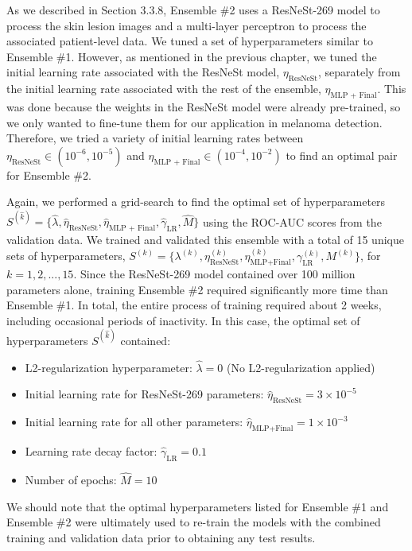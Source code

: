 \documentclass [MAS] {uclathes}
\begin{document}
As we described in Section 3.3.8, Ensemble \#2 uses a ResNeSt-269 model to process the skin lesion images and a multi-layer perceptron to process the associated patient-level data. We tuned a set of hyperparameters similar to Ensemble \#1. However, as mentioned in the previous chapter, we tuned the initial learning rate associated with the ResNeSt model, $\eta_{\text{ResNeSt}}$, separately from the initial learning rate associated with the rest of the ensemble, $\eta_{\text{MLP + Final}}$. This was done because the weights in the ResNeSt model were already pre-trained, so we only wanted to fine-tune them for our application in melanoma detection. Therefore, we tried a variety of initial learning rates between $\eta_{\text{ResNeSt}} \in (10^{-6}, 10^{-5})$ and $\eta_{\text{MLP + Final}} \in (10^{-4}, 10^{-2})$ to find an optimal pair for Ensemble \#2.

Again, we performed a grid-search to find the optimal set of hyperparameters $S^{(\hat k)} = \{\hat \lambda, \hat \eta_{\text{ResNeSt}}, \hat \eta_{\text{MLP + Final}}, \hat \gamma_{\text{LR}}, \hat M\}$ using the ROC-AUC scores from the validation data. We trained and validated this ensemble with a total of 15 unique sets of hyperparameters, $S^{(k)} = \{\lambda^{(k)}, \eta_{\text{ResNeSt}}^{(k)}, \eta_{\text{MLP+Final}}^{(k)}, \gamma_{\text{LR}}^{(k)}, M^{(k)}\}$, for $k=1, 2, ..., 15$. Since the ResNeSt-269 model contained over 100 million parameters alone, training Ensemble \#2 required significantly more time than Ensemble \#1. In total, the entire process of training required about 2 weeks, including occasional periods of inactivity. In this case, the optimal set of hyperparameters $S^{(\hat k)}$ contained:

\begin{itemize}
    \item L2-regularization hyperparameter: $\hat \lambda = 0$ (No L2-regularization applied)
    \item Initial learning rate for ResNeSt-269 parameters: $\hat \eta_{\text{ResNeSt}} = 3 \times 10^{-5}$
    \item Initial learning rate for all other parameters: $\hat \eta_{\text{MLP+Final}} = 1 \times 10^{-3}$
    \item Learning rate decay factor: $\hat \gamma_{\text{LR}} = 0.1$
    \item Number of epochs: $\hat M=10$
\end{itemize}

We should note that the optimal hyperparameters listed for Ensemble \#1 and Ensemble \#2 were ultimately used to re-train the models with the combined training and validation data prior to obtaining any test results.
\end{document}
